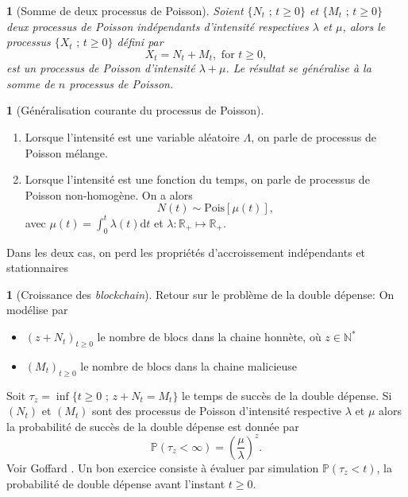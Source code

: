 \documentclass[8pt,notheorems]{beamer}
\def \N{\mathbb N}
\renewcommand{\Pr}{\mathbb{P}}
\newtheorem{prop}{\translate{Proposition}}
\theoremstyle{definition}
\theoremstyle{example}
\newtheorem{example}{\translate{Exemple}}
\theoremstyle{mystyle}
\newtheorem{remark}{\translate{Remarque}}
\theoremstyle{plain}
\begin{document}
\begin{frame}[allowframebreaks]
\begin{prop}[Somme de deux processus de Poisson]
Soient $\{N_t\text{ ; }t\geq0\}$ et $\{M_t\text{ ; }t\geq0\}$ deux processus de Poisson indépendants d'intensité respectives $\lambda$ et $\mu$, alors le processus $\{X_t\text{ ; }t\geq0 \}$ défini par
$$X_t=N_t+M_t,\text{ for }t\geq0,$$
est un processus de Poisson d'intensité $\lambda+\mu$. Le résultat se généralise à la somme de $n$ processus de Poisson.
\end{prop}
\begin{remark}[Généralisation courante du processus de Poisson]
\begin{enumerate}
  \item Lorsque l'intensité est une variable aléatoire $\Lambda$, on parle de processus de Poisson mélange.
  \item Lorsque l'intensité est une fonction du temps, on parle de processus de Poisson non-homogène. On a alors
  $$N(t)\sim\text{Pois}[\mu(t)],$$
  avec $\mu(t) = \int_{0}^t\lambda(t)\text{d}t$ et $\lambda:\mathbb{R}_+\mapsto\mathbb{R}_+$.
\end{enumerate}
Dans les deux cas, on perd les propriétés d'accroissement indépendants et stationnaires
\end{remark}
\begin{example}[Croissance des \textit{blockchain}]
Retour sur le problème de la double dépense: On modélise par
\begin{itemize}
  \item $(z+N_t)_{t\geq0}$ le nombre de blocs dans la chaine honnète, où $z\in \N^{\ast}$
  \item $(M_t)_{t\geq0}$ le nombre de blocs dans la chaine malicieuse
\end{itemize}
Soit $\tau_z=\inf\{t\geq0\text{ ; } z+N_t=M_t\}$ le temps de succès de la double dépense. Si $(N_t)$ et $(M_t)$ sont des processus de Poisson d'intensité respective $\lambda$ et $\mu$ alors la probabilité de succès de la double dépense est donnée par
$$
\Pr(\tau_z<\infty)=\left(\frac{\mu}{\lambda}\right)^z.
$$
Voir Goffard \cite{goffard2018fraud}. Un bon exercice consiste à évaluer par simulation $\Pr(\tau_z<t)$, la probabilité de double dépense avant l'instant $t\geq0$.
\end{example}
\end{frame}
\end{document}

